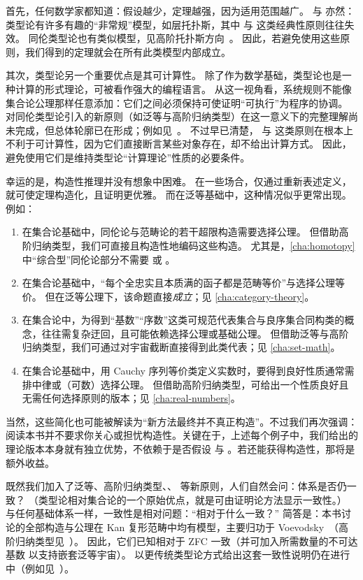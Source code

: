 首先，任何数学家都知道：假设越少，定理越强，因为适用范围越广。
\choice{} 与 \LEM{} 亦然：
类型论有许多有趣的“非常规”模型，如层托扑斯，其中 \choice{} 与 \LEM{} 这类经典性原则往往失效。
同伦类型论也有类似模型，见高阶托扑斯方向~\cite{ToenVezzosi02,Rezk05,lurie:higher-topoi}。
因此，若避免使用这些原则，我们得到的定理就会在所有此类模型内部成立。

其次，类型论另一个重要优点是其可计算性。
除了作为数学基础，类型论也是一种计算的形式理论，可被看作强大的编程语言。
%
从这一视角看，系统规则不能像集合论公理那样任意添加：它们之间必须保持可使证明“可执行”为程序的协调。
对同伦类型论引入的新原则（如泛等与高阶归纳类型）在这一意义下的完整理解尚未完成，但总体轮廓已在形成；例如见~\cite{lh:canonicity}。
不过早已清楚，\choice{} 与 \LEM{} 这类原则在根本上不利于可计算性，因为它们直接断言某些对象存在，却不给出计算方式。
因此，避免使用它们是维持类型论“计算理论”性质的必要条件。

幸运的是，构造性推理并没有想象中困难。
在一些场合，仅通过重新表述定义，就可使定理构造化，且证明更优雅。
而在泛等基础中，这种情况似乎更常出现。
例如：
\begin{enumerate}
\item 在集合论基础中，同伦论与范畴论的若干超限构造需要选择公理。
  但借助高阶归纳类型，我们可直接且构造性地编码这些构造。
  尤其是，\cref{cha:homotopy} 中“综合型”同伦论部分不需要 \LEM{} 或 \choice{}。
\item 在集合论基础中，“每个全忠实且本质满的函子都是范畴等价”与选择公理等价。
  但在泛等公理下，该命题直接\emph{成立}；见 \cref{cha:category-theory}。
\item 在集合论中，为得到“基数”“序数”这类可规范代表集合与良序集合同构类的概念，往往需复杂迂回，且可能依赖选择公理或基础公理。
  但借助泛等与高阶归纳类型，我们可通过对宇宙截断直接得到此类代表；见 \cref{cha:set-math}。
\item 在集合论基础中，用 Cauchy 序列等价类定义实数时，要得到良好性质通常需排中律或（可数）选择公理。
  但借助高阶归纳类型，可给出一个性质良好且无需任何选择原则的版本；见 \cref{cha:real-numbers}。
\end{enumerate}
当然，这些简化也可能被解读为“新方法最终并不真正构造”。不过我们再次强调：阅读本书并不要求你关心或担忧构造性。关键在于，上述每个例子中，我们给出的理论版本本身就有独立优势，不依赖于是否假设 \LEM{} 与 \choice{}。若还能获得构造性，那将是额外收益。%

既然我们加入了泛等、高阶归纳类型、\choice{}、\LEM{} 等新原则，人们自然会问：体系是否仍一致？
（类型论相对集合论的一个原始优点，就是可由证明论方法显示一致性。）
与任何基础体系一样，一致性是相对问题：“相对于什么一致？”
简答是：本书讨论的全部构造与公理在 Kan 复形范畴中均有模型，主要归功于 Voevodsky~\cite{klv:ssetmodel}（高阶归纳类型见~\cite{ls:hits}）。
因此，它们已知相对于 ZFC 一致（并可加入所需数量的不可达基数
%
以支持嵌套泛等宇宙）。
以更传统类型论方式给出这套一致性说明仍在进行中（例如见~\cite{lh:canonicity,coquand2012constructive}）。

